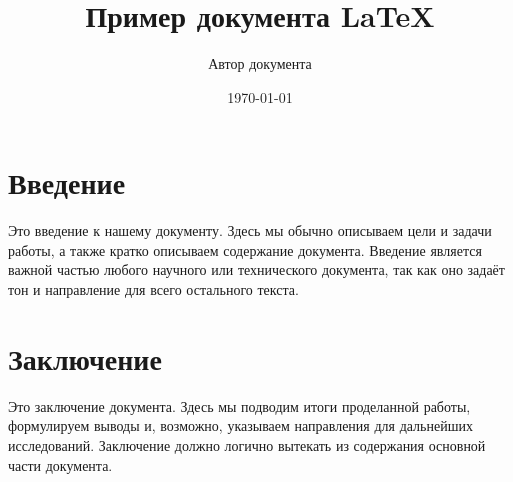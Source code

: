 \documentclass{article}
\title{Пример документа LaTeX}
\author{Автор документа}
\date{\today}
\begin{document}
\maketitle

\section{Введение}
Это введение к нашему документу. Здесь мы обычно описываем цели и задачи работы, а также кратко описываем содержание документа. Введение является важной частью любого научного или технического документа, так как оно задаёт тон и направление для всего остального текста.

\section{Заключение}
Это заключение документа. Здесь мы подводим итоги проделанной работы, формулируем выводы и, возможно, указываем направления для дальнейших исследований. Заключение должно логично вытекать из содержания основной части документа.
\end{document}
